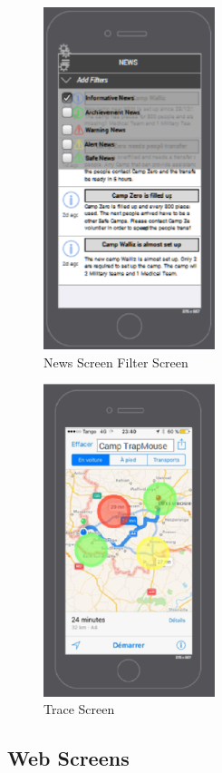 \begin{figure}[htbp]
\begin{center}
 \caption{\label{fig:A9} News Screen Filter Screen}
   \includegraphics[width=50mm]{./images/App/newsfilter.eps}
\end{center}
\end{figure}
\begin{figure}[htbp]
\begin{center}
 \caption{\label{fig:A10} Trace Screen}
   \includegraphics[width=50mm]{./images/App/traceroute.eps}
\end{center}
\end{figure}



\subsection{Web Screens}
